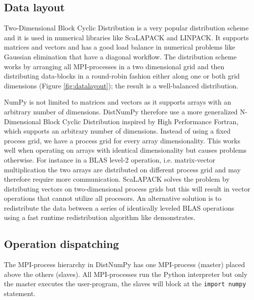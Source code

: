 \documentclass[10pt]{article}
\begin{document}
\subsection{Data layout}
Two-Dimensional Block Cyclic Distribution is a very popular distribution scheme and it is used in numerical libraries like ScaLAPACK\cite{Blackford96} and LINPACK\cite{linpack79}. It supports matrices and vectors and has a good load balance in numerical problems like Gaussian elimination that have a diagonal workflow. The distribution scheme works by arranging all MPI-processes in a two dimensional grid and then distributing data-blocks in a round-robin fashion either along one or both grid dimensions (Figure \ref {fig:datalayout}); the result is a well-balanced distribution.

NumPy is not limited to matrices and vectors as it supports arrays with an arbitrary number of dimensions. DistNumPy therefore use a more generalized N-Dimensional Block Cyclic Distribution inspired by High Performance Fortran\cite{Loveman93}, which supports an arbitrary number of dimensions. Instead of using a fixed process grid, we have a process grid for every array dimensionality. This works well when operating on arrays with identical dimensionality but causes problems otherwise. For instance in a BLAS level-2 operation, i.e. matrix-vector multiplication the two arrays are distributed on different process grid and may therefore require more communication. ScaLAPACK solves the problem by distributing vectors on two-dimensional process grids but this will result in vector operations that cannot utilize all procesors. An alternative solution is to redistribute the data between a series of identically leveled BLAS operations using a fast runtime redistribution algorithm like \cite{PrylliT97} demonstrates.


\subsection{Operation dispatching}
The MPI-process hierarchy in DistNumPy has one MPI-process (master) placed above the others (slaves). All MPI-processes run the Python interpreter but only the master executes the user-program, the slaves will block at the \texttt{import numpy} statement. 
\end{document}
